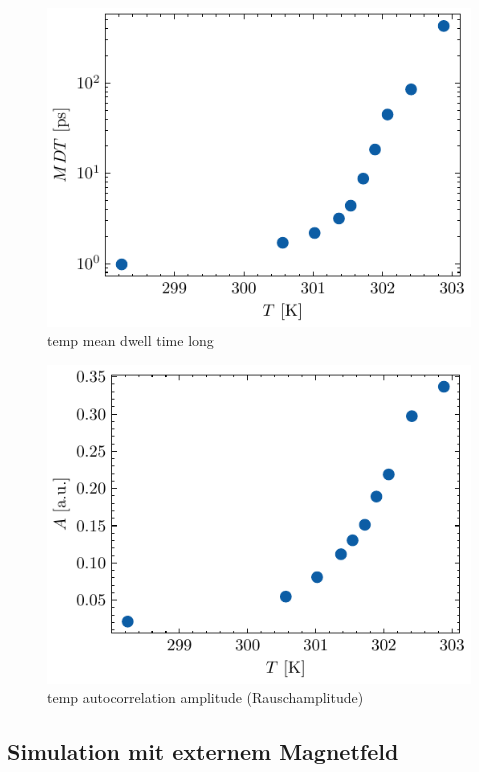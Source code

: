 \documentclass[main.tex]{subfiles}
\begin{document}
\begin{figure}[H]
    \centering
    \includegraphics{bilder/plots/temp_comparison_long/mean_dwell_time.pdf}
    \caption{temp mean dwell time long}\label{fig:temp-mdt-long}
\end{figure}


\begin{figure}[H]
    \centering
    \includegraphics{bilder/plots/temp_comparison_long/rauschamplitude.pdf}
    \caption{temp autocorrelation amplitude (Rauschamplitude)}\label{fig:temp-autocorr-amplitude}
\end{figure}

\subsection{Simulation mit externem Magnetfeld}
\end{document}
